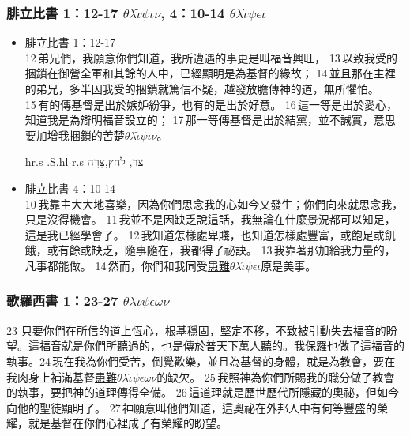  \subsubsection{腓立比書 1：12-17 $\theta$$\lambda$$\widetilde{\iota}$$\psi$$\iota$$\nu$, 4：10-14 $\theta$$\lambda$$\acute{\iota}$$\psi$$\epsilon$$\iota$}
 \begin{itemize} 
\itemsep-.25em
\item{腓立比書 1：12-17}\\ 12 弟兄們，我願意你們知道，我所遭遇的事更是叫福音興旺， 13 以致我受的捆鎖在御營全軍和其餘的人中，已經顯明是為基督的緣故； 14 並且那在主裡的弟兄，多半因我受的捆鎖就篤信不疑，越發放膽傳神的道，無所懼怕。 15 有的傳基督是出於嫉妒紛爭，也有的是出於好意。 16 這一等是出於愛心，知道我是為辯明福音設立的； 17 那一等傳基督是出於結黨，並不誠實，意思要加增我捆鎖的\underline{苦楚$\theta$$\lambda$$\widetilde{\iota}$$\psi$$\iota$$\nu$}。
 \begin{cjhebrew}
hr.s  .S.hl  r.s  צַר, לַחַץ,צָרָה 
 \end{cjhebrew}
 \item{腓立比書 4：10-14}\\ 10 我靠主大大地喜樂，因為你們思念我的心如今又發生；你們向來就思念我，只是沒得機會。 11 我並不是因缺乏說這話，我無論在什麼景況都可以知足，這是我已經學會了。 12 我知道怎樣處卑賤，也知道怎樣處豐富，或飽足或飢餓，或有餘或缺乏，隨事隨在，我都得了祕訣。 13 我靠著那加給我力量的，凡事都能做。 14 然而，你們和我同受\underline{患難$\theta$$\lambda$$\acute{\iota}$$\psi$$\epsilon$$\iota$}原是美事。
 \end{itemize}
 
 
 \subsubsection{歌羅西書 1：23-27 $\theta$$\lambda$$\acute{\iota}$$\psi$$\epsilon$$\omega$$\nu$}
 23 只要你們在所信的道上恆心，根基穩固，堅定不移，不致被引動失去福音的盼望。這福音就是你們所聽過的，也是傳於普天下萬人聽的。我保羅也做了這福音的執事。24 現在我為你們受苦，倒覺歡樂，並且為基督的身體，就是為教會，要在我肉身上補滿基督\underline{患難$\theta$$\lambda$$\acute{\iota}$$\psi$$\epsilon$$\omega$$\nu$}的缺欠。 25 我照神為你們所賜我的職分做了教會的執事，要把神的道理傳得全備。 26 這道理就是歷世歷代所隱藏的奧祕，但如今向他的聖徒顯明了。 27 神願意叫他們知道，這奧祕在外邦人中有何等豐盛的榮耀，就是基督在你們心裡成了有榮耀的盼望。
 
